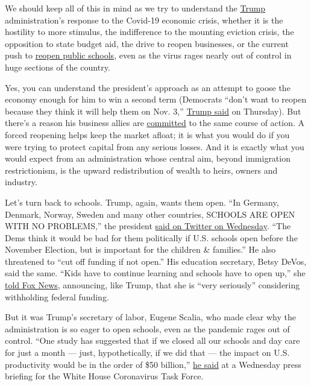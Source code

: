 We should keep all of this in mind as we try to understand the
\href{https://www.nytimes3xbfgragh.onion/2020/07/10/us/politics/trump-schools-reopening.html}{Trump}
administration's response to the Covid-19 economic crisis, whether it is
the hostility to more stimulus, the indifference to the mounting
eviction crisis, the opposition to state budget aid, the drive to reopen
businesses, or the current push to
\href{https://www.nytimes3xbfgragh.onion/2020/07/10/us/politics/trump-schools-reopening.html}{reopen
public schools}, even as the virus rages nearly out of control in huge
sections of the country.

Yes, you can understand the president's approach as an attempt to goose
the economy enough for him to win a second term (Democrats ``don't want
to reopen because they think it will help them on Nov. 3,''
\href{https://twitter.com/joshtpm/status/1281320469921136641?s=21}{Trump
said} on Thursday). But there's a reason his business allies are
\href{https://apnews.com/57f673f31fb343042e3806b9806e8f7d}{committed} to
the same course of action. A forced reopening helps keep the market
afloat; it is what you would do if you were trying to protect capital
from any serious losses. And it is exactly what you would expect from an
administration whose central aim, beyond immigration restrictionism, is
the upward redistribution of wealth to heirs, owners and industry.

Let's turn back to schools. Trump, again, wants them open. ``In Germany,
Denmark, Norway, Sweden and many other countries, SCHOOLS ARE OPEN WITH
NO PROBLEMS,'' the president
\href{https://twitter.com/realdonaldtrump/status/1280853299600789505?s=21}{said
on Twitter on Wednesday}. ``The Dems think it would be bad for them
politically if U.S. schools open before the November Election, but is
important for the children \& families.'' He also threatened to ``cut
off funding if not open.'' His education secretary, Betsy DeVos, said
the same. ``Kids have to continue learning and schools have to open
up,'' she
\href{https://thehill.com/homenews/administration/506427-devos-very-seriously-considering-withholding-funding-from-schools}{told
Fox News}, announcing, like Trump, that she is ``very seriously''
considering withholding federal funding.

But it was Trump's secretary of labor, Eugene Scalia, who made clear why
the administration is so eager to open schools, even as the pandemic
rages out of control. ``One study has suggested that if we closed all
our schools and day care for just a month --- just, hypothetically, if
we did that --- the impact on U.S. productivity would be in the order of
\$50 billion,''
\href{https://www.whitehouse.gov/briefings-statements/press-briefing-vice-president-pence-members-coronavirus-task-force-july-8-2020/}{he
said} at a Wednesday press briefing for the White House Coronavirus Task
Force.


